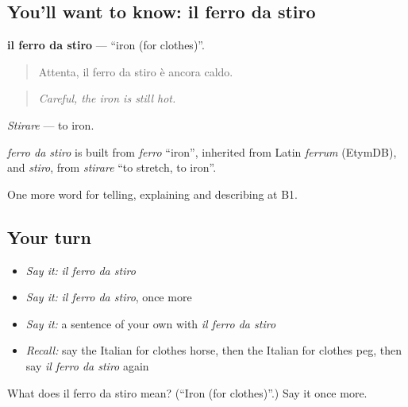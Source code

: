 \subsection*{You'll want to know: il ferro da stiro}
\textbf{il ferro da stiro} — \textquotedblleft{}iron (for clothes)\textquotedblright{}.

\begin{quote}
Attenta, il ferro da stiro è ancora caldo.
\end{quote}

\begin{quote}
\emph{Careful, the iron is still hot.}
\end{quote}

\emph{Stirare} — to iron.

\begin{cousinweb}
\emph{ferro da stiro} is built from \emph{ferro} \textquotedblleft{}iron\textquotedblright{}, inherited from Latin \emph{ferrum} (EtymDB), and \emph{stiro}, from \emph{stirare} \textquotedblleft{}to stretch, to iron\textquotedblright{}.
\end{cousinweb}

\begin{grammarlens}[title={What you've built}]
One more word for telling, explaining and describing at B1.
\end{grammarlens}

\subsection*{Your turn}
\begin{itemize}
\raggedright
  \item \emph{Say it:} \emph{il ferro da stiro}
  \item \emph{Say it:} \emph{il ferro da stiro}, once more
  \item \emph{Say it:} a sentence of your own with \emph{il ferro da stiro}
  \item \emph{Recall:} say the Italian for clothes horse, then the Italian for clothes peg, then say \emph{il ferro da stiro} again
\end{itemize}

\begin{tcolorbox}[breakable,colback=teal!4,colframe=teal!35!black,title={Before you move on}]
What does il ferro da stiro mean? (\textquotedblleft{}Iron (for clothes)\textquotedblright{}.) Say it once more.
\end{tcolorbox}
